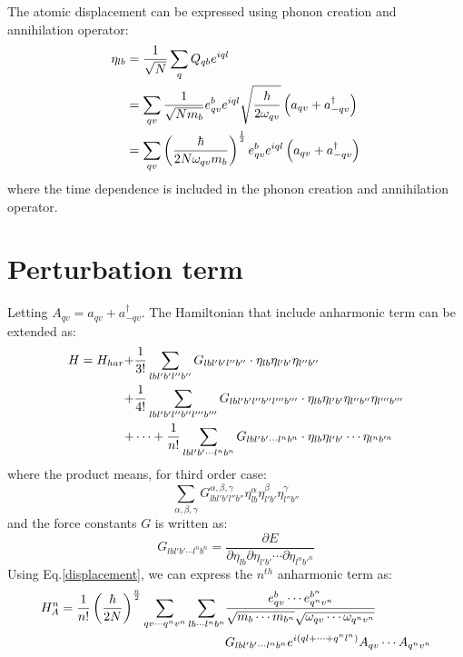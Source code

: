 \documentclass{article}
\begin{document}
The atomic displacement can be expressed using phonon creation and annihilation operator:
\begin{align}
    \eta_{lb} &= \frac{1}{\sqrt{N}} \sum_{q} Q_{qb} e^{iql} \notag \\
             &= \sum_{qv} \frac{1}{\sqrt{Nm_b}} e_{qv}^b e^{iql} \sqrt{\frac{\hbar}{2\omega_{qv}}} \left( a_{qv} + a^{\dagger}_{-qv} \right) \notag \\
             &= \sum_{qv} \left(\frac{\hbar}{2N\omega_{qv}m_b}\right)^{\frac{1}{2}} e_{qv}^b e^{iql} \left( a_{qv} + a^{\dagger}_{-qv} \right) \label{displacement}
\end{align}
where the time dependence is included in the phonon creation and annihilation operator.

\section{Perturbation term}
Letting $A_{qv} = a_{qv} + a^{\dagger}_{-qv}$. The Hamiltonian that include anharmonic term can be extended as:
\begin{align}
    H = H_{har} + &\frac{1}{3!}\sum_{lbl'b'l''b''} G_{lbl'b'l''b''} \cdot \eta_{lb} \eta_{l'b'}\eta_{l''b''} \notag \\
                + &\frac{1}{4!}\sum_{lbl'b'l''b''l'''b'''} G_{lbl'b'l''b''l'''b'''} \cdot \eta_{lb} \eta_{l'b'}\eta_{l''b''} \eta_{l'''b'''} \notag \\
                + & \cdots + \frac{1}{n!}\sum_{lbl'b'\cdots l^nb^n} G_{lbl'b'\cdots l^nb^n} \cdot \eta_{lb} \eta_{l'b'}\cdots \eta_{l^nb'^n} 
\end{align}
where the product means, for third order case:
\begin{equation}
    \sum_{\alpha,\beta,\gamma} G_{lbl'b'l''b''}^{\alpha,\beta,\gamma} \eta_{lb}^{\alpha} \eta_{l'b'}^{\beta}\eta_{l''b''}^{\gamma}
\end{equation}
and the force constants $G$ is written as:
\begin{equation}
    G_{lbl'b'\cdots l^nb^n} = \frac{\partial E}{\partial \eta_{lb} \partial \eta_{l'b'} \cdots \partial \eta_{l^nb'^n} }
\end{equation}
Using Eq.\ref{displacement}, we can express the $n^{th}$ anharmonic term as:
\begin{align}
    H_{A}^{n} = \frac{1}{n!} \left( \frac{\hbar}{2N} \right)^{\frac{n}{2}} \sum_{qv \cdots q^nv^n} \sum_{lb\cdots l^nb^n} 
    &\frac{e_{qv}^b \cdots e_{q^nv^n}^{b^n}}{\sqrt{m_b \cdots m_{b^n}}\sqrt{\omega_{qv} \cdots \omega_{q^nv^n}}} \notag \\
    &G_{lbl'b'\cdots l^nb^n} e^{i(ql + \cdots + q^nl^n)}
    A_{qv} \cdots A_{q^nv^n}
\end{align}
\end{document}
